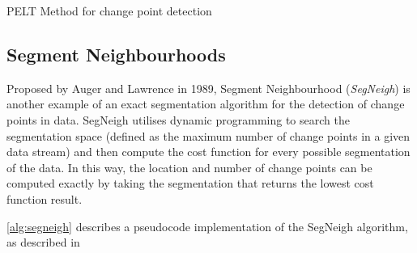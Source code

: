 \documentclass{uvamscse}	%
\begin{document}
\begin{algorithm}[H]
    \label{alg:pelt}
    \caption{PELT Method for change point detection}
    \DontPrintSemicolon
\end{algorithm}

\subsection{Segment Neighbourhoods}

Proposed by Auger and Lawrence in 1989, Segment Neighbourhood (\emph{SegNeigh}) is another example of an exact segmentation algorithm for the detection of change points in data. SegNeigh utilises dynamic programming to search the segmentation space (defined as the maximum number of change points in a given data stream) and then compute the cost function for every possible segmentation of the data. In this way, the location and number of change points can be computed exactly by taking the segmentation that returns the lowest cost function result.

\autoref{alg:segneigh} describes a pseudocode implementation of the SegNeigh algorithm, as described in \cite{Eckley2011}\newline
\end{document}
